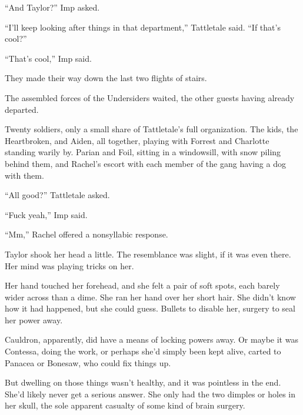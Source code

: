 ``And Taylor?''  Imp asked.



``I'll keep looking after things in that department,'' Tattletale said.  ``If that's cool?''



``That's cool,'' Imp said.



They made their way down the last two flights of stairs.



The assembled forces of the Undersiders waited, the other guests having already departed.



Twenty soldiers, only a small share of Tattletale's full organization.  The kids, the Heartbroken, and Aiden, all together, playing with Forrest and Charlotte standing warily by.  Parian and Foil, sitting in a windowsill, with snow piling behind them, and Rachel's escort with each member of the gang having a dog with them.



``All good?'' Tattletale asked.



``Fuck yeah,'' Imp said.



``Mm,'' Rachel offered a nonsyllabic response.



\blacksquare



Taylor shook her head a little.  The resemblance was slight, if it was even there.  Her mind was playing tricks on her.



Her hand touched her forehead, and she felt a pair of soft spots, each barely wider across than a dime.  She ran her hand over her short hair.  She didn't know how it had happened, but she could guess.  Bullets to disable her, surgery to seal her power away.



Cauldron, apparently, did have a means of locking powers away.  Or maybe it was Contessa, doing the work, or perhaps she'd simply been kept alive, carted to Panacea or Bonesaw, who could fix things up.



But dwelling on those things wasn't healthy, and it was pointless in the end.  She'd likely never get a serious answer.  She only had the two dimples or holes in her skull, the sole apparent casualty of some kind of brain surgery.




